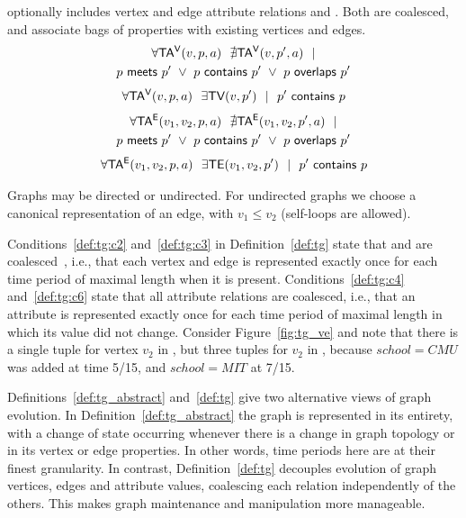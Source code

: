\begin{definition}
 optionally includes vertex and edge attribute relations \tav
and \tae.  Both are coalesced, and associate bags of properties with
existing vertices and edges.
\begin{multline}
\forall \mathsf{TA^{V}}(v, p, a)~~\nexists \mathsf{TA^{V}}(v, p', a)~~| \\
                       p~\mathsf{meets}~p'~\lor~p~\mathsf{contains}~p'~\lor~p~\mathsf{overlaps}~p'
\label{def:tg:c4}
\end{multline}
\begin{multline}
\forall \mathsf{TA^{V}}(v, p, a)~~\exists \textsf{TV}(v,p')~~|~~p'~\mathsf{contains}~p
\label{def:tg:c5}
\end{multline}
\begin{multline}
\forall \mathsf{TA^{E}}(v_1, v_2, p, a)~~\nexists \mathsf{TA^{E}}(v_1, v_2, p', a)~~| \\
                       p~\mathsf{meets}~p'~\lor~p~\mathsf{contains}~p'~\lor~p~\mathsf{overlaps}~p'
\label{def:tg:c6}
\end{multline}
\begin{multline}
\forall \mathsf{TA^{E}}(v_1, v_2, p, a)~~\exists \textsf{TE}(v_1,v_2,p')~~|~~p'~\mathsf{contains}~p
\label{def:tg:c7}
\end{multline}

\label{def:tg}
\end{definition}

Graphs may be directed or undirected.  For undirected graphs we choose
a canonical representation of an edge, with $v_1 \leq v_2$ (self-loops
are allowed).

Conditions~\ref{def:tg:c2} and~\ref{def:tg:c3} in
Definition~\ref{def:tg} state that \tv and \te are
coalesced~\cite{DBLP:conf/vldb/BohlenSS96}, i.e., that each vertex and
edge is represented exactly once for each time period of maximal
length when it is present.  Conditions~\ref{def:tg:c4}
and~\ref{def:tg:c6} state that all attribute relations are coalesced,
i.e., that an attribute is represented exactly once for each time
period of maximal length in which its value did not change.  Consider
Figure~\ref{fig:tg_ve} and note that there is a single tuple for
vertex $v_2$ in \tv, but three tuples for $v_2$ in \tav, because
$school=CMU$ was added at time 5/15, and $school=MIT$ at 7/15.

Definitions~\ref{def:tg_abstract} and~\ref{def:tg} give two
alternative views of graph evolution.  In
Definition~\ref{def:tg_abstract} the graph is represented in its
entirety, with a change of state occurring whenever there is a change
in graph topology or in its vertex or edge properties.  In other
words, time periods here are at their finest granularity.  In
contrast, Definition~\ref{def:tg} decouples evolution of graph
vertices, edges and attribute values, coalescing each relation
independently of the others.  This makes graph maintenance and
manipulation more manageable.

